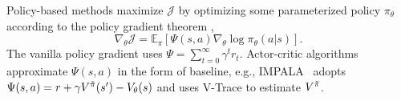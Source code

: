Policy-based methods maximize $\mathcal{J}$ by optimizing some parameterized policy $\pi_\theta$ according to the policy gradient theorem \citep{sutton}, 
\begin{equation}
\nabla_\theta \mathcal{J} = %
\mathbb{E}_{\pi} %
[\Psi(s, a) \nabla_\theta \log \pi_\theta(a|s)].
\end{equation}
{ The vanilla policy gradient uses $\Psi = \sum_{t=0}^\infty \gamma^t r_{t}$.}
Actor-critic algorithms approximate $\Psi(s,a)$ in the form of baseline, e.g., 
IMPALA~\citep{impala} adopts $\Psi(s, a) = r + \gamma V^{\Tilde{\pi}} (s') - V_{\theta} (s)$ and uses V-Trace to estimate $V^{\Tilde{\pi}}$.

